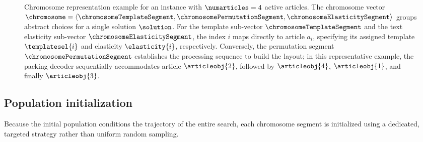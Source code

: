 \begin{figure}[htbp]

\caption{Chromosome representation example for an instance with $\numarticles=4$ active articles. The chromosome vector $\chromosome = \langle \chromosomeTemplateSegment, \chromosomePermutationSegment, \chromosomeElasticitySegment \rangle$ groups abstract choices for a single solution $\solution$. For the template sub-vector $\chromosomeTemplateSegment$ and the text elasticity sub-vector $\chromosomeElasticitySegment$, the index $i$ maps directly to article $a_i$, specifying its assigned template $\templatesel{i}$ and elasticity $\elasticity{i}$, respectively. Conversely, the permutation segment $\chromosomePermutationSegment$ establishes the processing sequence to build the layout; in this representative example, the packing decoder sequentially accommodates article $\articleobj{2}$, followed by $\articleobj{4}$, $\articleobj{1}$, and finally $\articleobj{3}$.}
\label{fig:chromosome_representation}
\end{figure}

\subsection{Population initialization}
\label{sec:population_initialization}

Because the initial population conditions the trajectory of the entire search, each chromosome segment is initialized using a dedicated, targeted strategy rather than uniform random sampling.


